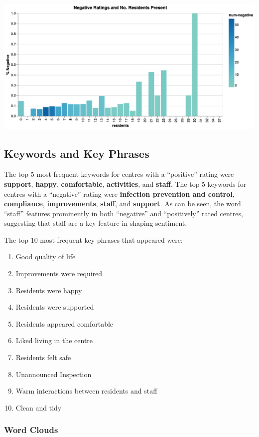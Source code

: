\documentclass[a4paper,11pt,twoside]{article}
\begin{document}
\begin{center}
\includegraphics[width=.9\linewidth]{img/18_rating_res_neg.png}
\end{center}
\subsection{Keywords and Key Phrases}
\label{sec:org27eb62a}

The top 5 most frequent keywords for centres with a ``positive'' rating were \textbf{support}, \textbf{happy}, \textbf{comfortable}, \textbf{activities}, and \textbf{staff}. The top 5 keywords for centres with a ``negative'' rating were \textbf{infection prevention and control}, \textbf{compliance}, \textbf{improvements}, \textbf{staff}, and \textbf{support}. As can be seen, the word ``staff'' features prominently in both ``negative'' and ``positively'' rated centres, suggesting that staff are a key feature in shaping sentiment.

The top 10 most frequent key phrases that appeared were:

\begin{enumerate}
\item Good quality of life
\item Improvements were required
\item Residents were happy
\item Residents were supported
\item Residents appeared comfortable
\item Liked living in the centre
\item Residents felt safe
\item Unannounced Inspection
\item Warm interactions between residents and staff
\item Clean and tidy
\end{enumerate}
\subsubsection{Word Clouds}
\label{sec:org3d8c0cb}
\end{document}
